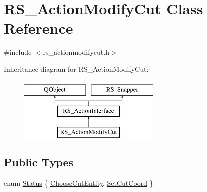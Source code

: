 \hypertarget{classRS__ActionModifyCut}{\section{R\-S\-\_\-\-Action\-Modify\-Cut Class Reference}
\label{classRS__ActionModifyCut}
}


{\ttfamily \#include $<$rs\-\_\-actionmodifycut.\-h$>$}

Inheritance diagram for R\-S\-\_\-\-Action\-Modify\-Cut\-:\begin{figure}[H]
\begin{center}
\leavevmode
\includegraphics[height=3.000000cm]{classRS__ActionModifyCut}
\end{center}
\end{figure}
\subsection*{Public Types}
\begin{DoxyCompactItemize}
\item 
enum \hyperlink{classRS__ActionModifyCut_a5777f39854f76d3b456617bdd165f675}{Status} \{ \hyperlink{classRS__ActionModifyCut_a5777f39854f76d3b456617bdd165f675a04b69f4bb1a0a61d4cfd016f24ed6895}{Choose\-Cut\-Entity}, 
\hyperlink{classRS__ActionModifyCut_a5777f39854f76d3b456617bdd165f675a037a12bfeb22b9e8a782c7e03d028b41}{Set\-Cut\-Coord}
 \}
\end{DoxyCompactItemize}
